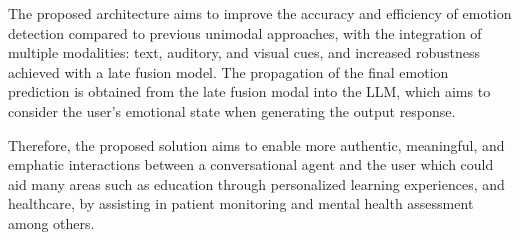 \documentclass[runningheads]{llncs}
\begin{document}
The proposed architecture aims to improve the accuracy and efficiency of emotion detection compared to previous unimodal approaches, with the integration of multiple modalities: text, auditory, and visual cues, and increased robustness achieved with a late fusion model. The propagation of the final emotion prediction is obtained from the late fusion modal into the LLM, which aims to consider the user's emotional state when generating the output response.

Therefore, the proposed solution aims to enable more authentic, meaningful, and emphatic interactions between a conversational agent and the user which could aid many areas such as education through personalized learning experiences, and healthcare, by assisting in patient monitoring and mental health assessment among others.




\end{document}
